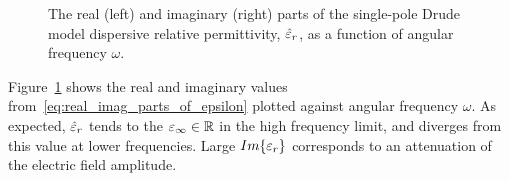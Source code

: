 \begin{figure}[htbp!]
  \caption{The real (left) and imaginary (right) parts of the single-pole
    Drude model dispersive relative permittivity, $\hat{\varepsilon}_r$, as a function
    of angular frequency $\omega$.}\label{fig:real-and-imag-effective-permittivity}
\end{figure}
Figure~\ref{fig:real-and-imag-effective-permittivity} shows the real and imaginary
values from~\eqref{eq:real_imag_parts_of_epsilon} plotted
against angular frequency $\omega$. As expected, $\hat{\varepsilon}_r$ tends to the $\varepsilon_{\infty} \in \mathbb{R}$ in the high frequency limit,
and diverges from this value at lower frequencies.
Large $Im\{\varepsilon_r\}$ corresponds to an attenuation of the electric field amplitude.

